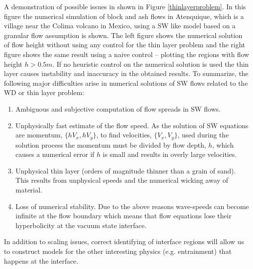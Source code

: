 \documentclass[review]{elsarticle}
\begin{document}
A demonstration of possible issues in shown in Figure \ref{thinlayerproblem}.
In this figure the numerical simulation of block and ash flows in Atenquique, which is a village near the Colima volcano in Mexico, using a SW like model 
based on a granular flow assumption is shown. The left figure shows the numerical solution of flow height without using any control for the thin layer problem 
and the right figure shows the same result  
using a naive control -- plotting the regions with flow height $h>0.5m$. If no heuristic control on the numerical solution is used the thin layer causes instability and 
inaccuracy in the obtained results.
To summarize, the following major difficulties arise in numerical solutions of SW flows related to the WD or thin layer problem:
\begin{enumerate}
        \item Ambiguous and subjective computation of flow spreads in SW flows.
        \item \label{problemwicking}
             Unphysically fast estimate of the flow speed. As the solution of SW equations are momentum, $\{hV_x,hV_y\}$, to find velocities, $\{V_x,V_y\}$, used during the solution process the
             momentum must be divided by flow depth, $h$, which causes a numerical error if $h$ is small and results in overly large velocities.
        \item \label{problemtoothin}
              Unphysical thin layer (orders of magnitude thinner than a grain of sand). This results from unphysical speeds and the numerical wicking away of material.
        \item \label{problemunstable}
              Loss of numerical stability. Due to the above reasons wave-speeds can become infinite at the flow boundary which means that flow equations lose their hyperbolicity  
              at the vacuum state interface.
\end{enumerate}\label{thinprob}

In addition to scaling issues, correct identifying of interface regions will allow us to construct models for the other interesting physics (e.g. entrainment) that happens at the interface.
\end{document}
